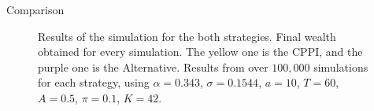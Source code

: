 \documentclass[10pt]{beamer}
\begin{document}
\begin{frame}[fragile]{Comparison}
  \begin{figure}[htbp]
    \centering
    \hfill
    \caption{Results of the simulation for the both strategies. Final wealth obtained for every simulation. The yellow one is the CPPI, and the purple one is the Alternative. Results from over $100,000$ simulations for each strategy, using $\alpha = 0.343$, $\sigma = 0.1544$, $a = 10$, $T = 60$, $A = 0.5$, $\pi = 0.1$, $K = 42$.} \label{fig:1}
  \end{figure}
\end{frame}
\end{document}
